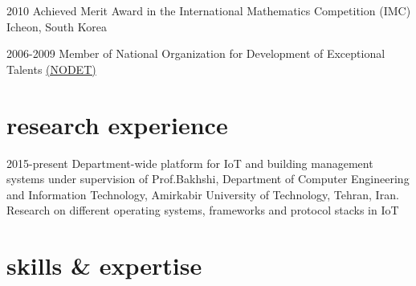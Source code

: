 \documentclass[]{friggeri-cv} %
\begin{document}
\begin{entrylist}

\entry
{2010}
{{\normalfont Achieved} \textcolor{Ocean}{Merit Award} {\normalfont in the International Mathematics Competition (IMC) Icheon, South Korea}}
{}
{}


\entry
{2006-2009}
{\normalfont Member of National Organization for Development of Exceptional Talents \href{https://en.wikipedia.org/wiki/National_Organization_for_Development_of_Exceptional_Talents}{(NODET)}}
{}
{}


\end{entrylist}


\section{research experience}

\begin{entrylist}

\entry
{2015-present}
{Department-wide platform for IoT and building management systems}
{under supervision of Prof.Bakhshi, Department of Computer Engineering and Information Technology, Amirkabir University of Technology, Tehran, Iran.}
{Research on different operating systems, frameworks and protocol stacks in IoT}

\end{entrylist}


\section{skills \& expertise}
\end{document}
